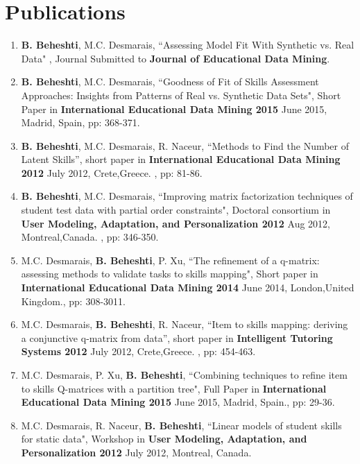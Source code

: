 \section{Publications}
\begin{enumerate}

\item \textbf{B. Beheshti}, M.C. Desmarais, “Assessing Model Fit With Synthetic vs. Real Data" , Journal Submitted to \textbf{Journal of Educational Data Mining}.

\item \textbf{B. Beheshti}, M.C. Desmarais, “Goodness of Fit of Skills Assessment Approaches: Insights from Patterns of Real vs. Synthetic Data Sets", Short Paper  in \textbf{International Educational Data Mining 2015} June 2015, Madrid, Spain, pp: 368-371.

\item \textbf{B. Beheshti}, M.C. Desmarais, R. Naceur, “Methods to Find the Number of Latent Skills”, short paper in \textbf{International Educational Data Mining 2012} July 2012, Crete,Greece. , pp: 81-86.

\item \textbf{B. Beheshti}, M.C. Desmarais, “Improving matrix factorization techniques of student test data with partial order constraints", Doctoral consortium in \textbf{User Modeling, Adaptation, and Personalization 2012} Aug 2012, Montreal,Canada. , pp: 346-350.

\item M.C. Desmarais, \textbf{B. Beheshti}, P. Xu, “The refinement of a q-matrix: assessing methods to validate tasks to skills mapping", Short paper in \textbf{International Educational Data Mining 2014} June 2014, London,United Kingdom., pp: 308-3011.

\item M.C. Desmarais, \textbf{B. Beheshti}, R. Naceur, “Item to skills mapping: deriving a conjunctive q-matrix from data”, short paper in \textbf{Intelligent Tutoring Systems 2012} July 2012, Crete,Greece. , pp: 454-463.

\item M.C. Desmarais, P. Xu, \textbf{B. Beheshti}, “Combining techniques to refine item to skills Q-matrices with a partition tree", Full Paper  in \textbf{International Educational Data Mining 2015} June 2015, Madrid, Spain., pp: 29-36.

\item M.C. Desmarais, R. Naceur, \textbf{B. Beheshti}, “Linear models of student skills for static data", Workshop in \textbf{User Modeling, Adaptation, and Personalization 2012} July 2012, Montreal, Canada.
\end{enumerate}


